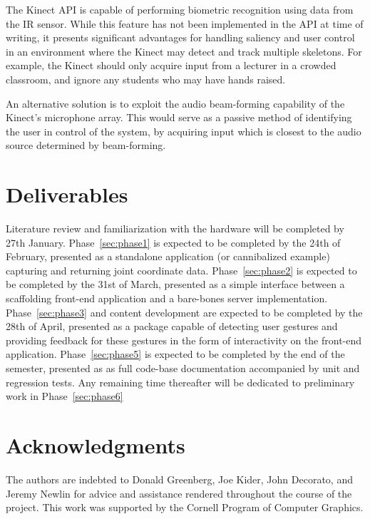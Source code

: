 \documentclass{scrartcl}
\numberwithin{equation}{section}
\begin{document}
      The Kinect API is capable of performing biometric recognition using data from the IR sensor. While this feature has not been implemented in the API at time of writing, it presents significant advantages for handling saliency and user control in an environment where the Kinect may detect and track multiple skeletons. For example, the Kinect should only acquire input from a lecturer in a crowded classroom, and ignore any students who may have hands raised.

      An alternative solution is to exploit the audio beam-forming capability of the Kinect's microphone array. This would serve as a passive method of identifying the user in control of the system, by acquiring input which is closest to the audio source determined by beam-forming.
  \section{Deliverables}
      Literature review and familiarization with the hardware will be completed by 27th January. Phase~\ref{sec:phase1} is expected to be completed by the 24th of February, presented as a standalone application (or cannibalized example) capturing and returning joint coordinate data. Phase~\ref{sec:phase2} is expected to be completed by the 31st of March, presented as a simple interface between a scaffolding front-end application and a bare-bones server implementation. Phase~\ref{sec:phase3} and content development are expected to be completed by the 28th of April, presented as a package capable of detecting user gestures and providing feedback for these gestures in the form of interactivity on the front-end application. Phase~\ref{sec:phase5} is expected to be completed by the end of the semester, presented as as full code-base documentation accompanied by unit and regression tests. Any remaining time thereafter will be dedicated to preliminary work in Phase~\ref{sec:phase6}
  \section{Acknowledgments}
    The authors are indebted to Donald Greenberg, Joe Kider, John Decorato, and Jeremy Newlin for advice and assistance rendered throughout the course of the project. This work was supported by the Cornell Program of Computer Graphics.
\end{document}
